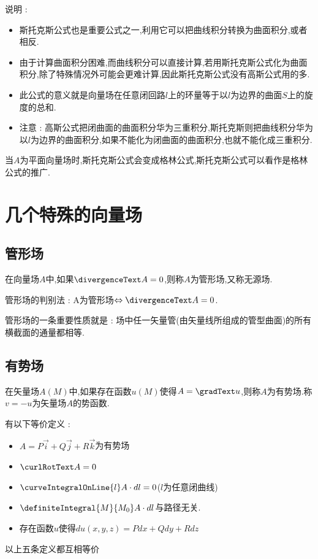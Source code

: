 {{{{      说明 :
      \begin{itemize}
        \item 斯托克斯公式也是重要公式之一,利用它可以把曲线积分转换为曲面积分,或者相反.
        \item 由于计算曲面积分困难,而曲线积分可以直接计算,若用斯托克斯公式化为曲面积分,除了特殊情况外可能会更难计算,因此斯托克斯公式没有高斯公式用的多.
        \item 此公式的意义就是向量场在任意闭回路$l$上的环量等于以$l$为边界的曲面$S$上的旋度的总和.
        \item 注意 : 高斯公式把闭曲面的曲面积分华为三重积分,斯托克斯则把曲线积分华为以$l$为边界的曲面积分,如果不能化为闭曲面的曲面积分,也就不能化成三重积分.
      \end{itemize}

      当$A$为平面向量场时,斯托克斯公式会变成格林公式,斯托克斯公式可以看作是格林公式的推广.
    }%

   }%

  \section{几个特殊的向量场}{

    \subsection{管形场}{
      在向量场$A$中,如果$\divergenceText A = 0$,则称$A$为管形场,又称无源场.

      管形场的判别法 : A为管形场$\Leftrightarrow \divergenceText A = 0$.

      管形场的一条重要性质就是 : 场中任一矢量管(由矢量线所组成的管型曲面)的所有横截面的通量都相等.
    }%

    \subsection{有势场}{
      在矢量场$A(M)$中,如果存在函数$u(M)$使得$A = \gradText u$,则称$A$为有势场.称$v = -u$为矢量场$A$的势函数.

      有以下等价定义 :
      \begin{itemize}
        \item $A = P\vec{i} + Q\vec{j} + R\vec{k}$为有势场
        \item $\curlRotText A = 0$
        \item $\curveIntegralOnLine{l} A \cdot dl = 0$($l$为任意闭曲线)
        \item $\definiteIntegral{M}{M_0}A \cdot dl$与路径无关.
        \item 存在函数$u$使得$du(x,y,z) = Pdx + Qdy + Rdz$
      \end{itemize}
      以上五条定义都互相等价

}}}}
